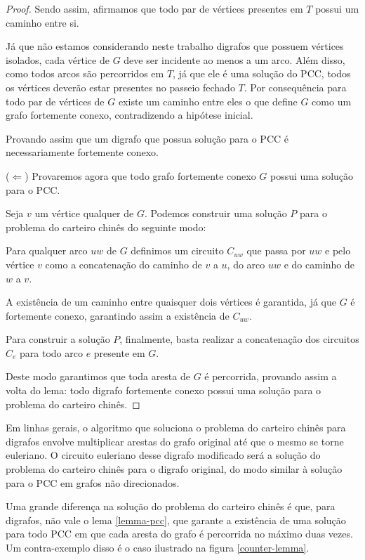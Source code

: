 \begin{proof}
        Sendo assim, afirmamos que todo par de vértices presentes em $T$ possui um caminho entre si.

        Já que não estamos considerando neste trabalho digrafos que possuem vértices isolados, cada vértice de $G$ deve ser incidente ao menos a um arco. Além disso, como todos arcos são percorridos em $T$, já que ele é uma solução do PCC, todos os vértices deverão estar presentes no passeio fechado $T$.
        Por consequência para todo par de vértices de $G$ existe um caminho entre eles o que define $G$ como um grafo fortemente conexo, contradizendo a hipótese inicial.

        Provando assim que um digrafo que possua solução para o PCC é necessariamente fortemente conexo. 

        ($\Leftarrow$)  Provaremos agora que todo grafo fortemente conexo $G$ possui uma solução para o PCC.

        Seja $v$ um vértice qualquer de $G$. Podemos construir uma solução $P$ para o problema do carteiro chinês do seguinte modo:


        Para qualquer arco $uw$ de $G$ definimos um circuito $C_{uw}$ que passa por $uw$ e pelo vértice $v$ como a concatenação do caminho de $v$ a $u$, do arco $uw$ e do caminho de $w$ a $v$.
        
        A existência de um caminho entre quaisquer dois vértices é garantida, já que $G$ é fortemente conexo, garantindo assim a existência de $C_{uw}$.
        
        Para construir a solução $P$, finalmente, basta realizar a concatenação dos circuitos $C_{e}$ para todo arco $e$ presente em $G$.

        Deste modo garantimos que toda aresta de $G$ é percorrida, provando assim a volta do lema: todo digrafo fortemente conexo possui uma solução para o problema do carteiro chinês.

    \end{proof}

    Em linhas gerais, o algoritmo que soluciona o problema do carteiro chinês para digrafos envolve multiplicar arestas do grafo original até que o mesmo se torne euleriano. O circuito euleriano desse digrafo modificado será a solução do problema do carteiro chinês para o digrafo original, do modo similar à solução para o PCC em grafos não direcionados.
    
    Uma grande diferença na solução do problema do carteiro chinês é que, para digrafos, não vale o lema \ref{lemma-pcc}, que garante a existência de uma solução para todo PCC em que cada aresta do grafo é percorrida no máximo duas vezes.
    Um contra-exemplo disso é o caso ilustrado na figura \ref{counter-lemma}. 

